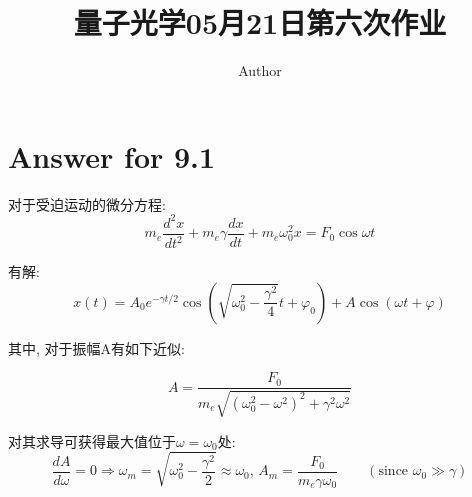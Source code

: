 \documentclass[twoside]{article}
\begin{document}
\title{量子光学05月21日第六次作业}
\author{Author}
\pagestyle{fancy}
\makeatletter
\fancyhead[L]{\@title}
\fancyhead[R]{\@author}
\makeatother
\setlength{\parindent}{0pt}


\section*{Answer for 9.1}

对于受迫运动的微分方程:
$$
    m_e \frac{d^2 x}{dt^2} + m_e \gamma \frac{dx}{dt} + m_e \omega_0^2 x = F_0 \cos\omega t
$$


有解:
\begin{equation}
    x(t) = A_0 e^{-\gamma t/2} \cos\left(\sqrt{\omega_0^2 - \frac{\gamma^2}{4}} t + \varphi_0\right) + A \cos\left(\omega t + \varphi\right)
\end{equation}

其中, 对于振幅A有如下近似:

\begin{equation}
    A = \frac{F_0}{m_e \sqrt{\left(\omega_0^2 - \omega^2\right)^2 + \gamma^2 \omega^2}}
\end{equation}

对其求导可获得最大值位于$\omega = \omega_0$处:
\begin{equation}
    \frac{dA}{d\omega} = 0 \Rightarrow \omega_{m} = \sqrt{\omega_0^2 - \frac{\gamma^2}{2}} \approx \omega_0 \text{, }
    A_m = \frac{F_0}{m_e \gamma\omega_0} \qquad (\text{since }\omega_0 \gg \gamma)
\end{equation}
\end{document}
